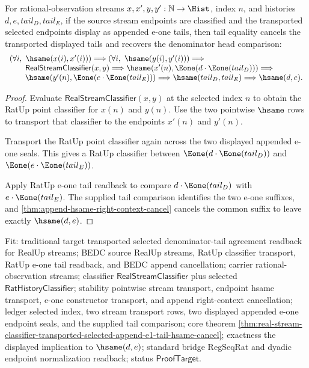 \begin{theorem}
\label{thm:real-stream-classifier-transported-selected-append-e1-tail-hsame-cancel}
For rational-observation streams $x,x',y,y':\mathbb{N}\to\Hist$, index $n$,
and histories $d,e,tail_D,tail_E$, if the source stream endpoints are
classified and the transported selected endpoints display as appended e-one
tails, then tail equality cancels the transported displayed tails and recovers
the denominator head comparison:
$$
\begin{array}{l}
(\forall i,\ \hsame(x(i),x'(i)))\Longrightarrow
(\forall i,\ \hsame(y(i),y'(i)))\Longrightarrow\\
\qquad
\mathsf{RealStreamClassifier}(x,y)\Longrightarrow
\hsame(x'(n),\Eone(d\cdot\Eone(tail_D)))\Longrightarrow\\
\qquad
\hsame(y'(n),\Eone(e\cdot\Eone(tail_E)))\Longrightarrow
\hsame(tail_D,tail_E)\Longrightarrow
\hsame(d,e).
\end{array}
$$
\end{theorem}
\begin{proof}
Evaluate $\mathsf{RealStreamClassifier}(x,y)$ at the selected index $n$ to
obtain the RatUp point classifier for $x(n)$ and $y(n)$. Use the two pointwise
$\hsame$ rows to transport that classifier to the endpoints $x'(n)$ and
$y'(n)$.

Transport the RatUp point classifier again across the two displayed appended
e-one seals. This gives a RatUp classifier between
$\Eone(d\cdot\Eone(tail_D))$ and $\Eone(e\cdot\Eone(tail_E))$.

Apply RatUp e-one tail readback to compare
$d\cdot\Eone(tail_D)$ with $e\cdot\Eone(tail_E)$. The supplied tail comparison
identifies the two e-one suffixes, and
\autoref{thm:append-hsame-right-context-cancel} cancels the common suffix to
leave exactly $\hsame(d,e)$.
\end{proof}

Fit: traditional target transported selected denominator-tail agreement
readback for RealUp streams; BEDC source RealUp streams, RatUp classifier
transport, RatUp e-one tail readback, and BEDC append cancellation; carrier
rational-observation streams; classifier $\mathsf{RealStreamClassifier}$ plus
selected $\mathsf{RatHistoryClassifier}$; stability pointwise stream transport,
endpoint hsame transport, e-one constructor transport, and append right-context
cancellation; ledger selected index, two stream transport rows, two displayed
appended e-one endpoint seals, and the supplied tail comparison; core theorem
\autoref{thm:real-stream-classifier-transported-selected-append-e1-tail-hsame-cancel};
exactness the displayed implication to $\hsame(d,e)$; standard bridge RegSeqRat
and dyadic endpoint normalization readback; status $\mathsf{ProofTarget}$.

